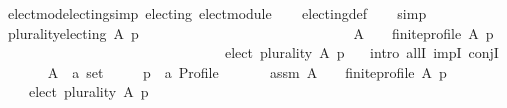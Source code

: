 \begin{isabellebody}
\isanewline
{}%
\endisatagtheory
{\isafoldtheory}%
%
\isadelimtheory
\isanewline
%
\endisadelimtheory
\isanewline
{}\isamarkupfalse%
\ elect{\isacharunderscore}{\kern0pt}mod{\isacharunderscore}{\kern0pt}electing{\isacharbrackleft}{\kern0pt}simp{\isacharbrackright}{\kern0pt}{\isacharcolon}{\kern0pt}\ {\isachardoublequoteopen}electing\ elect{\isacharunderscore}{\kern0pt}module{\isachardoublequoteclose}\isanewline
%
\isadelimproof
\ \ %
\endisadelimproof
%
\isatagproof
{}\isamarkupfalse%
\ electing{\isacharunderscore}{\kern0pt}def\isanewline
\ \ \isamarkupfalse%
\ simp%
\endisatagproof
{\isafoldproof}%
%
\isadelimproof
\isanewline
%
\endisadelimproof
\isanewline
{}\isamarkupfalse%
\ plurality{\isacharunderscore}{\kern0pt}electing{}{\isacharcolon}{\kern0pt}\ {\isachardoublequoteopen}{\isasymforall}A\ p{\isachardot}{\kern0pt}\isanewline
\ \ \ \ \ \ \ \ \ \ \ \ \ \ \ \ \ \ \ \ \ \ \ \ \ \ \ \ \ \ {\isacharparenleft}{\kern0pt}A\ {\isasymnoteq}\ {\isacharbraceleft}{\kern0pt}{\isacharbraceright}{\kern0pt}\ {\isasymand}\ finite{\isacharunderscore}{\kern0pt}profile\ A\ p{\isacharparenright}{\kern0pt}\ {\isasymlongrightarrow}\isanewline
\ \ \ \ \ \ \ \ \ \ \ \ \ \ \ \ \ \ \ \ \ \ \ \ \ \ \ \ \ \ \ \ elect\ plurality\ A\ p\ {\isasymnoteq}\ {\isacharbraceleft}{\kern0pt}{\isacharbraceright}{\kern0pt}{\isachardoublequoteclose}\isanewline
%
\isadelimproof
%
\endisadelimproof
%
\isatagproof
{}\isamarkupfalse%
\ {\isacharparenleft}{\kern0pt}intro\ allI\ impI\ conjI{\isacharparenright}{\kern0pt}\isanewline
\ \ \isamarkupfalse%
\isanewline
\ \ \ \ A\ {\isacharcolon}{\kern0pt}{\isacharcolon}{\kern0pt}\ {\isachardoublequoteopen}{\isacharprime}{\kern0pt}a\ set{\isachardoublequoteclose}\ \isanewline
\ \ \ \ p\ {\isacharcolon}{\kern0pt}{\isacharcolon}{\kern0pt}\ {\isachardoublequoteopen}{\isacharprime}{\kern0pt}a\ Profile{\isachardoublequoteclose}\isanewline
\ \ \isamarkupfalse%
\isanewline
\ \ \ \ assm{}{\isacharcolon}{\kern0pt}\ {\isachardoublequoteopen}A\ {\isasymnoteq}\ {\isacharbraceleft}{\kern0pt}{\isacharbraceright}{\kern0pt}\ {\isasymand}\ finite{\isacharunderscore}{\kern0pt}profile\ A\ p{\isachardoublequoteclose}\isanewline
\ \ \isamarkupfalse%
\isanewline
\ \ \ \ {\isachardoublequoteopen}elect\ plurality\ A\ p\ {\isasymnoteq}\ {\isacharbraceleft}{\kern0pt}{\isacharbraceright}{\kern0pt}{\isachardoublequoteclose}\isanewline
\ \ \isamarkupfalse%
\isanewline
\ \ \ \ \isamarkupfalse%

\end{isabellebody}
